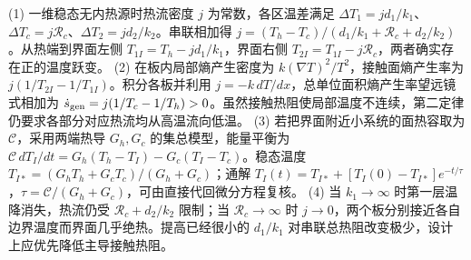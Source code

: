 (1) 一维稳态无内热源时热流密度 \(j\) 为常数，各区温差满足 \(\Delta T_1=jd_1/k_1\)、\(\Delta T_c=j\mathcal R_c\)、\(\Delta T_2=jd_2/k_2\)。串联相加得 \(j=(T_h-T_c)/(d_1/k_1+\mathcal R_c+d_2/k_2)\)。从热端到界面左侧 \(T_{1I}=T_h-jd_1/k_1\)，界面右侧 \(T_{2I}=T_{1I}-j\mathcal R_c\)，两者确实存在正的温度跃变。
(2) 在板内局部熵产生密度为 \(k(\nabla T)^2/T^2\)，接触面熵产生率为 \(j(1/T_{2I}-1/T_{1I})\)。积分各板并利用 \(j=-k\,dT/dx\)，总单位面积熵产生率望远镜式相加为 \(\dot s_{\rm gen}=j(1/T_c-1/T_h)>0\)。虽然接触热阻使局部温度不连续，第二定律仍要求各部分对应热流均从高温流向低温。
(3) 若把界面附近小系统的面热容取为 \(\mathcal C\)，采用两端热导 \(G_h,G_c\) 的集总模型，能量平衡为 \(\mathcal C\,dT_I/dt=G_h(T_h-T_I)-G_c(T_I-T_c)\)。稳态温度 \(T_{I*}=(G_hT_h+G_cT_c)/(G_h+G_c)\)；通解 \(T_I(t)=T_{I*}+[T_I(0)-T_{I*}]e^{-t/\tau}\)，\(\tau=\mathcal C/(G_h+G_c)\)，可由直接代回微分方程复核。
(4) 当 \(k_1\to\infty\) 时第一层温降消失，热流仍受 \(\mathcal R_c+d_2/k_2\) 限制；当 \(\mathcal R_c\to\infty\) 时 \(j\to0\)，两个板分别接近各自边界温度而界面几乎绝热。提高已经很小的 \(d_1/k_1\) 对串联总热阻改变极少，设计上应优先降低主导接触热阻。
